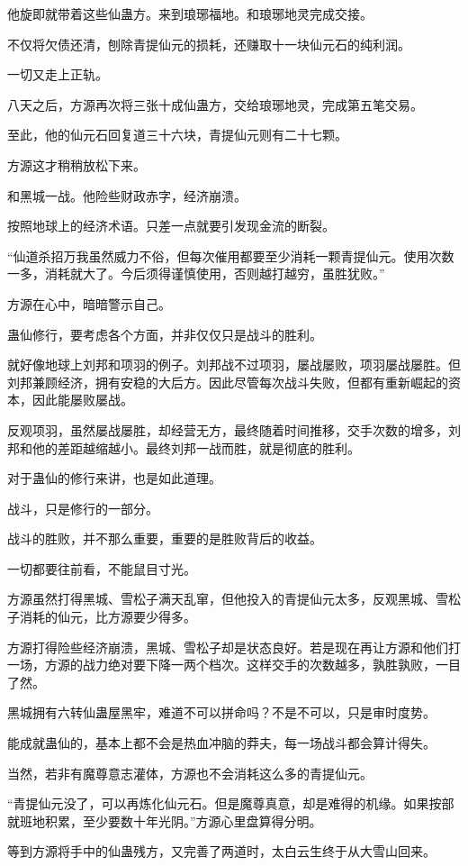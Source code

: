\begin{this_body}
他旋即就带着这些仙蛊方。来到琅琊福地。和琅琊地灵完成交接。

不仅将欠债还清，刨除青提仙元的损耗，还赚取十一块仙元石的纯利润。

一切又走上正轨。

八天之后，方源再次将三张十成仙蛊方，交给琅琊地灵，完成第五笔交易。

至此，他的仙元石回复道三十六块，青提仙元则有二十七颗。

方源这才稍稍放松下来。

和黑城一战。他险些财政赤字，经济崩溃。

按照地球上的经济术语。只差一点就要引发现金流的断裂。

“仙道杀招万我虽然威力不俗，但每次催用都要至少消耗一颗青提仙元。使用次数一多，消耗就大了。今后须得谨慎使用，否则越打越穷，虽胜犹败。”

方源在心中，暗暗警示自己。

蛊仙修行，要考虑各个方面，并非仅仅只是战斗的胜利。

就好像地球上刘邦和项羽的例子。刘邦战不过项羽，屡战屡败，项羽屡战屡胜。但刘邦兼顾经济，拥有安稳的大后方。因此尽管每次战斗失败，但都有重新崛起的资本，因此能屡败屡战。

反观项羽，虽然屡战屡胜，却经营无方，最终随着时间推移，交手次数的增多，刘邦和他的差距越缩越小。最终刘邦一战而胜，就是彻底的胜利。

对于蛊仙的修行来讲，也是如此道理。

战斗，只是修行的一部分。

战斗的胜败，并不那么重要，重要的是胜败背后的收益。

一切都要往前看，不能鼠目寸光。

方源虽然打得黑城、雪松子满天乱窜，但他投入的青提仙元太多，反观黑城、雪松子消耗的仙元，比方源要少得多。

方源打得险些经济崩溃，黑城、雪松子却是状态良好。若是现在再让方源和他们打一场，方源的战力绝对要下降一两个档次。这样交手的次数越多，孰胜孰败，一目了然。

黑城拥有六转仙蛊屋黑牢，难道不可以拼命吗？不是不可以，只是审时度势。

能成就蛊仙的，基本上都不会是热血冲脑的莽夫，每一场战斗都会算计得失。

当然，若非有魔尊意志灌体，方源也不会消耗这么多的青提仙元。

“青提仙元没了，可以再炼化仙元石。但是魔尊真意，却是难得的机缘。如果按部就班地积累，至少要数十年光阴。”方源心里盘算得分明。

等到方源将手中的仙蛊残方，又完善了两道时，太白云生终于从大雪山回来。


\end{this_body}
